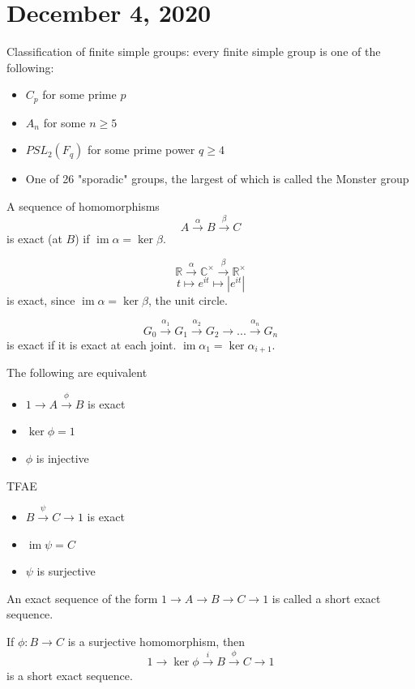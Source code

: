 \documentclass{article}
\newcommand{\C}{\mathbb{C}}
\newcommand{\R}{\mathbb{R}}
\newcommand{\ra}[1][]{\xrightarrow{#1}}
\DeclareMathOperator{\im}{im}
\begin{document}
\section{December 4, 2020}
Classification of finite simple groups: every finite simple group is one of the following:
\begin{itemize}
    \item $C_p$ for some prime $p$
    \item $A_n$ for some $n\geq 5$
    \item $PSL_2(F_q)$ for some prime power $q\geq 4$
    \item One of 26 "sporadic" groups, the largest of which is called the Monster group
\end{itemize}
\begin{definition}
A sequence of homomorphisms
$$A\ra[\alpha]B\ra[\beta]C$$ is exact (at $B$) if $\im\alpha=\ker\beta$.
\end{definition}
\begin{example}
$$\R\ra[\alpha]\C^\times\ra[\beta]\R^\times$$
$$t\mapsto e^{it}\mapsto |e^{it}|$$
is exact, since $\im\alpha=\ker\beta$, the unit circle.
\end{example}
\begin{definition}
$$G_0\ra[\alpha_1]G_1\ra[\alpha_2]G_2\ra...\ra[\alpha_n]G_n$$
is exact if it is exact at each joint. $\im\alpha_1=\ker\alpha_{i+1}$.
\end{definition}
\begin{example}
The following are equivalent
\begin{itemize}
    \item $1\ra A\ra[\phi] B$ is exact
    \item $\ker\phi=1$
    \item $\phi$ is injective
\end{itemize}
\end{example}
\begin{example}
TFAE
\begin{itemize}
    \item $B\ra[\psi]C\ra 1$ is exact
    \item $\im\psi=C$
    \item $\psi$ is surjective
\end{itemize}
\end{example}
\begin{definition}
An exact sequence of the form $1\ra A\ra B\ra C\ra 1$ is called a short exact sequence.
\end{definition}
\begin{example}
If $\phi:B\ra C$ is a surjective homomorphism, then 
$$1\ra\ker\phi\ra[i]B\ra[\phi]C\ra 1$$ is a short exact sequence.
\end{example}
\end{document}
